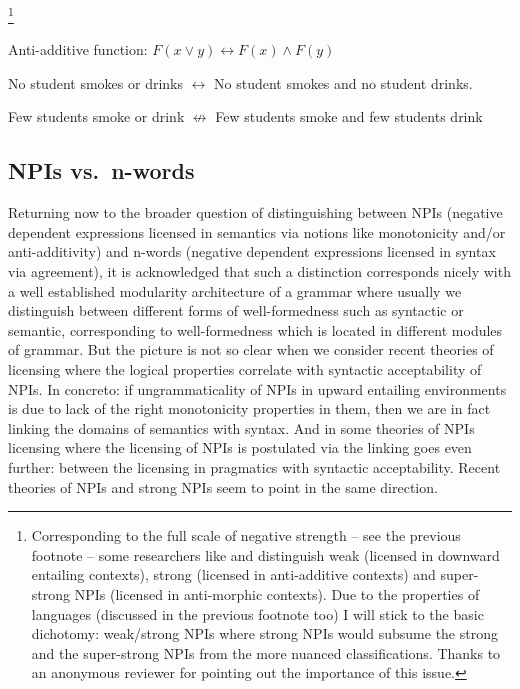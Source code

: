 \documentclass[output=paper, colorlinks, citecolor=brown, newtxmath]{langsci/langscibook}
\begin{document}
\footnote{Corresponding to the full scale of negative strength -- see the previous footnote -- some researchers like \citet{krifka1995semantics} and \citet{van2002negative} distinguish weak (licensed in downward entailing contexts), strong (licensed in anti-additive contexts) and super-strong NPIs (licensed in anti-morphic contexts). Due to the  properties of  languages (discussed in the previous footnote too) I will stick to the basic dichotomy: weak/strong NPIs where strong NPIs would subsume the strong and the super-strong NPIs from the more nuanced classifications. Thanks to an anonymous reviewer for pointing out the importance of this issue.}

\ea\label{ex-19} Anti-additive function: $F(x \vee y) \leftrightarrow F(x) \wedge F(y)$
\z

\ea\label{ex-20} No student smokes or drinks $\leftrightarrow$ No student smokes and no student drinks.
\z

\ea\label{ex-21} Few students smoke or drink $\not\leftrightarrow$ Few students smoke and few students drink \label{ex:few}
\z


\subsection{NPIs vs.~n-words}\label{npis-vs.n-words-modularity}

Returning now to the broader question of distinguishing between NPIs (negative dependent expressions licensed in semantics via notions like monotonicity and/or anti-additivity) and n-words (negative dependent expressions licensed in syntax via agreement), it is acknowledged that such a distinction corresponds nicely with a well established modularity architecture of a grammar where usually we  distinguish between different forms of well-formedness such as syntactic or semantic, corresponding to well-formedness which is located in different modules of grammar. But the picture is not so clear when we consider recent theories of  licensing where the  logical properties correlate with syntactic acceptability of NPIs. In concreto: if ungrammaticality of NPIs in upward entailing environments is due to lack of the right monotonicity properties in them, then we are in fact linking the domains of semantics with syntax. And in some theories \citep{heim1984note,crnivc2014against} of NPIs licensing where the licensing of NPIs is postulated via  the linking goes even further: between the licensing in pragmatics with syntactic acceptability. Recent theories of NPIs \citep{chierchia2013logic} and strong NPIs \citep{gajewski2011licensing} seem to point in the same direction.
\end{document}
